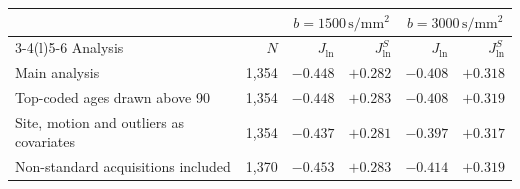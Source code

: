 \begin{tabular}{@{}lrrrrr@{}}
\toprule
 & & \multicolumn{2}{c}{$b=1500\,\mathrm{s/mm^2}$} & \multicolumn{2}{c}{$b=3000\,\mathrm{s/mm^2}$}\\
\cmidrule(lr){3-4}\cmidrule(l){5-6}
Analysis & $N$ & $J_{\ln}$ & $J_{\ln}^{S}$ & $J_{\ln}$ & $J_{\ln}^{S}$\\
\midrule
Main analysis & 1,354 & $-0.448$ & $+0.282$ & $-0.408$ & $+0.318$\\
Top-coded ages drawn above 90 & 1,354 & $-0.448$ & $+0.283$ & $-0.408$ & $+0.319$\\
Site, motion and outliers as covariates & 1,354 & $-0.437$ & $+0.281$ & $-0.397$ & $+0.317$\\
Non-standard acquisitions included & 1,370 & $-0.453$ & $+0.283$ & $-0.414$ & $+0.319$\\
\bottomrule
\end{tabular}
